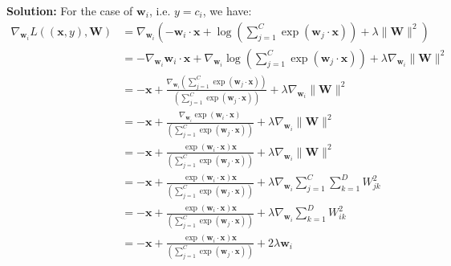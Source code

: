 \documentclass{article}
\renewcommand{\vec}[1]{\mathbf{#1}}
\newcommand{\mat}[1]{\mathbf{#1}}
\begin{document}
\noindent\textbf{Solution:} For the case of $\vec w_i$, i.e. $y=c_i$, we have:
\begin{align*}
    \nabla_{\vec w_i}L((\vec x,y),\mat W)&=\nabla_{\vec w_i}\left(-\vec w_i\cdot\vec x+\log\left(\sum_{j=1}^C\exp(\vec w_j\cdot\vec x)\right)+\lambda\|\mat W\|^2\right)\\
    &=-\nabla_{\vec w_i}\vec w_i\cdot\vec x+\nabla_{\vec w_i}\log\left(\sum_{j=1}^C\exp(\vec w_j\cdot\vec x)\right)+\lambda\nabla_{\vec w_i}\|\mat W\|^2\\
    &=-\vec x+\frac{\nabla_{\vec w_i}\left(\sum_{j=1}^C\exp(\vec w_j\cdot\vec x)\right)}{\left(\sum_{j=1}^C\exp(\vec w_j\cdot\vec x)\right)}+\lambda\nabla_{\vec w_i}\|\mat W\|^2\tag{chain rule}\\
    &=-\vec x+\frac{\nabla_{\vec w_i}\exp(\vec w_i\cdot\vec x)}{\left(\sum_{j=1}^C\exp(\vec w_j\cdot\vec x)\right)}+\lambda\nabla_{\vec w_i}\|\mat W\|^2\\
    &=-\vec x+\frac{\exp(\vec w_i\cdot\vec x)\vec x}{\left(\sum_{j=1}^C\exp(\vec w_j\cdot\vec x)\right)}+\lambda\nabla_{\vec w_i}\|\mat W\|^2\\
    &=-\vec x+\frac{\exp(\vec w_i\cdot\vec x)\vec x}{\left(\sum_{j=1}^C\exp(\vec w_j\cdot\vec x)\right)}+\lambda\nabla_{\vec w_i}\sum_{j=1}^C\sum_{k=1}^DW_{jk}^2\\
    &=-\vec x+\frac{\exp(\vec w_i\cdot\vec x)\vec x}{\left(\sum_{j=1}^C\exp(\vec w_j\cdot\vec x)\right)}+\lambda\nabla_{\vec w_i}\sum_{k=1}^DW_{ik}^2\\
    &=-\vec x+\frac{\exp(\vec w_i\cdot\vec x)\vec x}{\left(\sum_{j=1}^C\exp(\vec w_j\cdot\vec x)\right)}+2\lambda\vec w_i
\end{align*}
\end{document}
